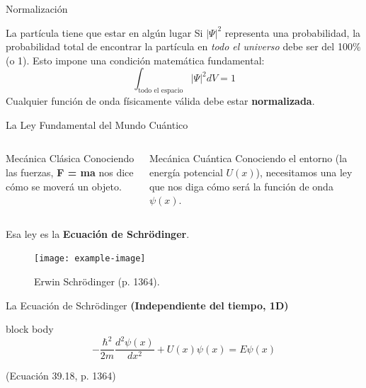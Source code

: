 \documentclass[12pt,aspectratio=169]{beamer}
\begin{document}
	\begin{frame}{Normalización}
	\begin{block}{La partícula tiene que estar en algún lugar}
		Si $|\Psi|^2$ representa una probabilidad, la probabilidad total de encontrar la partícula en \textit{todo el universo} debe ser del 100\% (o 1).
		\vspace{0.5em}
		Esto impone una condición matemática fundamental:
		\begin{equation*}
			\int_{\text{todo el espacio}} |\Psi|^2 dV = 1
		\end{equation*}
		Cualquier función de onda físicamente válida debe estar \textbf{normalizada}.
	\end{block}
\end{frame}

\begin{frame}{La Ley Fundamental del Mundo Cuántico}
	\begin{columns}
		\begin{block}{Mecánica Clásica}
			Conociendo las fuerzas, \textbf{F = ma} nos dice cómo se moverá un objeto.
		\end{block}
		\begin{block}{Mecánica Cuántica}
			Conociendo el entorno (la energía potencial $U(x)$), necesitamos una ley que nos diga cómo será la función de onda $\psi(x)$.
		\end{block}
	\end{columns}
	\vfill
	\centering
	Esa ley es la \textbf{Ecuación de Schrödinger}.
	\begin{figure}
		\texttt{[image: example-image]} %
		\caption{Erwin Schrödinger (p. 1364).}
	\end{figure}
\end{frame}

\begin{frame}{La Ecuación de Schrödinger}
	\centering\textbf{(Independiente del tiempo, 1D)}\medskip
	\begin{beamercolorbox}[sep=0.3cm,center,wd=\textwidth]{block body}
		\Huge
		\begin{equation*}
			-\frac{\hbar^2}{2m} \frac{d^2\psi(x)}{dx^2} + U(x)\psi(x) = E\psi(x)
		\end{equation*}
	\end{beamercolorbox}
	\medskip
	\centering (Ecuación 39.18, p. 1364)
\end{frame}
\end{document}
